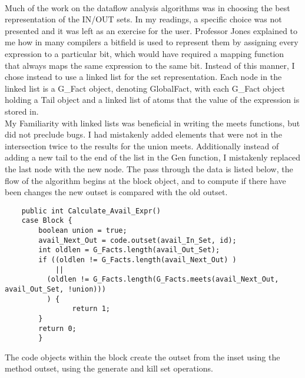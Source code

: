 \documentclass[14pt]{article}
\begin{document}
\paragraph{}
Much of the work on the dataflow analysis algorithms was in choosing the best representation of the IN/OUT sets. In my readings, a specific choice was not presented and it was left as an exercise for the user. Professor Jones explained to me how in many compilers a bitfield is used to represent them by assigning every expression to a particular bit, which would have required a mapping function that always maps the same expression to the same bit. Instead of this manner, I chose instead to use a linked list for the set representation. Each node in the linked list is a G\_Fact object, denoting GlobalFact, with each G\_Fact object holding a Tail object and a linked list of atoms that the value of the expression is stored in.\\My Familiarity with linked lists was beneficial in writing the meets functions, but did not preclude bugs. I had mistakenly added elements that were not in the intersection twice to the results for the union meets. Additionally instead of adding a new tail to the end of the list in the Gen function, I mistakenly replaced the last node with the new node.
The pass through the data is listed below, the flow of the algorithm begins at the block object, and to compute if there have been changes the new outset is compared with the old outset.
\begin{verbatim}
	public int Calculate_Avail_Expr()
	case Block {
	    boolean union = true;
	    avail_Next_Out = code.outset(avail_In_Set, id);
	    int oldlen = G_Facts.length(avail_Out_Set);
	    if ((oldlen != G_Facts.length(avail_Next_Out) )
	        ||
	      (oldlen != G_Facts.length(G_Facts.meets(avail_Next_Out, avail_Out_Set, !union)))
	      ) {
	      		return 1;
	    }	
	    return 0;
		}
\end{verbatim}
The code objects within the block create the outset from the inset using the method outset, using the generate and kill set operations.
\end{document}
